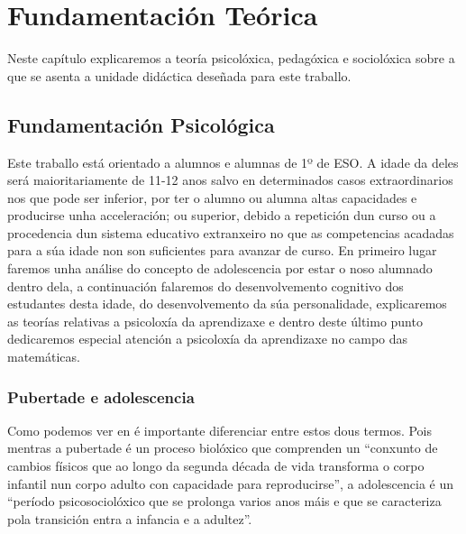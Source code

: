 \chapter{Fundamentación Teórica}\label{chap:fundamentacion}
Neste capítulo explicaremos a teoría psicolóxica, pedagóxica e sociolóxica sobre a que se asenta a unidade didáctica deseñada para este traballo.

\section{Fundamentación Psicológica}
Este traballo está orientado a alumnos e alumnas de 1º de ESO. A idade da deles será maioritariamente de 11-12 anos salvo en determinados casos extraordinarios nos que pode ser inferior, por ter o alumno ou alumna altas capacidades e producirse unha acceleración; ou superior, debido a repetición dun curso ou a procedencia dun sistema educativo extranxeiro no que as competencias acadadas para a súa idade non son suficientes para avanzar de curso. En primeiro lugar faremos unha análise do concepto de adolescencia por estar o noso alumnado dentro dela, a continuación falaremos do desenvolvemento cognitivo dos estudantes desta idade, do desenvolvemento da súa personalidade, explicaremos as teorías relativas a psicoloxía da aprendizaxe e dentro deste último punto dedicaremos especial atención a psicoloxía da aprendizaxe no campo das matemáticas.

\subsection{Pubertade e adolescencia}
Como podemos ver en \cite[p.~436]{coll1990desarrollo} é importante diferenciar entre estos dous termos. Pois mentras a pubertade é un proceso biolóxico que comprenden un ``conxunto de cambios físicos que ao longo da segunda década de vida transforma o corpo infantil nun corpo adulto con capacidade para reproducirse'', a adolescencia é un ``período psicosociolóxico que se prolonga varios anos máis e que se caracteriza pola transición entra a infancia e a adultez''.

